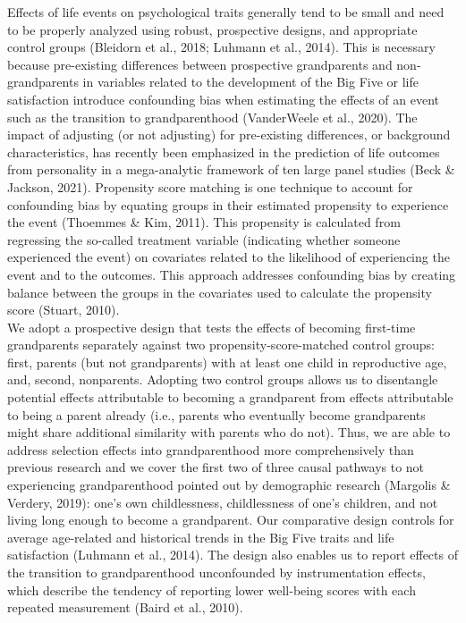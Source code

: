\documentclass[
  english,
  man, noextraspace]{apa7}
\begin{document}
Effects of life events on psychological traits generally tend to be small and need to be properly analyzed using robust, prospective designs, and appropriate control groups (Bleidorn et al., 2018; Luhmann et al., 2014). This is necessary because pre-existing differences between prospective grandparents and non-grandparents in variables related to the development of the Big Five or life satisfaction introduce confounding bias when estimating the effects of an event such as the transition to grandparenthood (VanderWeele et al., 2020). The impact of adjusting (or not adjusting) for pre-existing differences, or background characteristics, has recently been emphasized in the prediction of life outcomes from personality in a mega-analytic framework of ten large panel studies (Beck \& Jackson, 2021). Propensity score matching is one technique to account for confounding bias by equating groups in their estimated propensity to experience the event (Thoemmes \& Kim, 2011). This propensity is calculated from regressing the so-called treatment variable (indicating whether someone experienced the event) on covariates related to the likelihood of experiencing the event and to the outcomes. This approach addresses confounding bias by creating balance between the groups in the covariates used to calculate the propensity score (Stuart, 2010).\\
We adopt a prospective design that tests the effects of becoming first-time grandparents separately against two propensity-score-matched control groups: first, parents (but not grandparents) with at least one child in reproductive age, and, second, nonparents. Adopting two control groups allows us to disentangle potential effects attributable to becoming a grandparent from effects attributable to being a parent already (i.e., parents who eventually become grandparents might share additional similarity with parents who do not). Thus, we are able to address selection effects into grandparenthood more comprehensively than previous research and we cover the first two of three causal pathways to not experiencing grandparenthood pointed out by demographic research (Margolis \& Verdery, 2019): one's own childlessness, childlessness of one's children, and not living long enough to become a grandparent. Our comparative design controls for average age-related and historical trends in the Big Five traits and life satisfaction (Luhmann et al., 2014). The design also enables us to report effects of the transition to grandparenthood unconfounded by instrumentation effects, which describe the tendency of reporting lower well-being scores with each repeated measurement (Baird et al., 2010).\\
\end{document}
